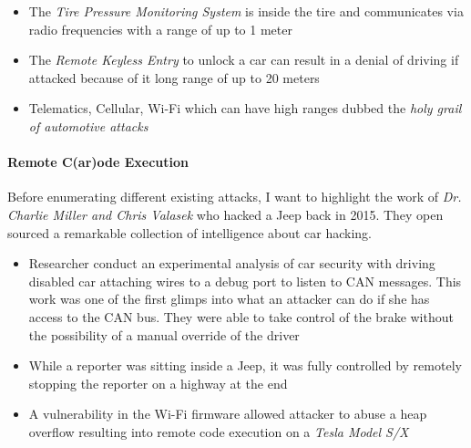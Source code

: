 \documentclass{homework}
\begin{document}
\begin{itemize}
    \item The \emph{Tire Pressure Monitoring System} is inside the tire and communicates via radio frequencies with a range of up to 1 meter
    \item The \emph{Remote Keyless Entry} to unlock a car can result in a denial of driving if attacked because of it long range of up to 20 meters
    \item Telematics, Cellular, Wi-Fi which can have high ranges dubbed the \emph{holy grail of automotive attacks}
\end{itemize}

\paragraph{\textbf{Remote C(ar)ode Execution}}

Before enumerating different existing attacks, I want to highlight the work of \emph{Dr. Charlie Miller and Chris Valasek} who hacked
a Jeep back in 2015. They open sourced a remarkable collection of intelligence about car hacking.

\begin{itemize}
    \item Researcher conduct an experimental analysis of car security with driving disabled car attaching wires to a debug port to listen to CAN messages. This work was one of the first glimps into what an attacker can do if she has access to the CAN bus. They were able to take control of the brake without the possibility of a manual override of the driver~\cite{hackingacorvert}
    \item While a reporter was sitting inside a Jeep, it was fully controlled by remotely stopping the reporter on a highway at the end~\cite{carhackingWired}
    \item A vulnerability in the Wi-Fi firmware allowed attacker to abuse a heap overflow resulting into remote code execution on a \emph{Tesla Model S/X}~\cite{hackwifitecent}
\end{itemize}
\end{document}
